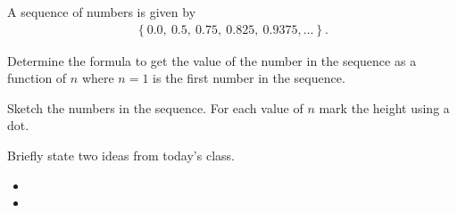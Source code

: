 \begin{problem}
  \item A sequence of numbers is given by
    \begin{eqnarray*}
      \left\{ 0.0,~0.5,~0.75,~0.825,~0.9375, \ldots \right\}.
    \end{eqnarray*}

    \begin{subproblem}
    \item Determine the formula to get the value of the number in the
      sequence as a function of $n$ where $n=1$ is the first number in
      the sequence.

      \vfill

    \item Sketch the numbers in the sequence. For each value of $n$
      mark the height using a dot.

      \scalebox{0.8}{}

    \end{subproblem}


\end{problem}


\postClass

\begin{problem}
\item Briefly state two ideas from today's class.
  \begin{itemize}
  \item 
  \item 
  \end{itemize}
\item 
  \begin{subproblem}
    \item
  \end{subproblem}
\end{problem}




\begin{problem}
\item
\end{problem}


